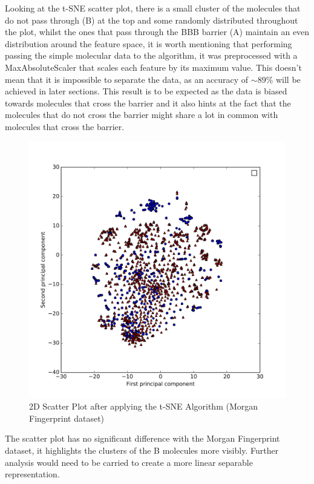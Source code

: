 \documentclass[a4paper,12pt]{report}
\begin{document}
		Looking at the t-SNE scatter plot, there is a small cluster of the molecules that do not pass through (B) at the top and some randomly distributed throughout the plot, whilst the ones that pass through the BBB barrier (A) maintain an even distribution around the feature space, it is worth mentioning that performing passing the simple molecular data to the algorithm, it was preprocessed with a MaxAbsoluteScaler that scales each feature by its maximum value. This doesn't mean that it is impossible to separate the data, as an accuracy of $\sim89\%$ will be achieved in later sections. This result is to be expected as the data is biased towards molecules that cross the barrier and it also hints at the fact that the molecules that do not cross the barrier might share a lot in common with molecules that cross the barrier.
		\begin{figure}[H]
			\centering
			\includegraphics[width=\textwidth,scale=1,totalheight=0.5\textheight]{images/scatter_tsne_mfps}
			\caption{2D Scatter Plot after applying the t-SNE Algorithm (Morgan Fingerprint dataset)}
			\label{fig:scatter_tsne_mfps_2D}
		\end{figure}
		The scatter plot has no significant difference with the Morgan Fingerprint dataset, it highlights the clusters of the B molecules more visibly. Further analysis would need to be carried to create a more linear separable representation.
\end{document}
